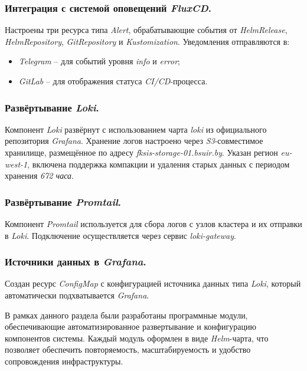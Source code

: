 \subsubsection{Интеграция с системой оповещений \textit{FluxCD}.} Настроены три ресурса типа \textit{Alert}, обрабатывающие события от \textit{HelmRelease}, \textit{HelmRepository}, \textit{GitRepository} и \textit{Kustomization}. Уведомления отправляются в:

\begin{itemize}
    \item \textit{Telegram} -- для событий уровня \textit{info} и \textit{error};
    \item \textit{GitLab} -- для отображения статуса \textit{CI/CD}-процесса.
\end{itemize}

\subsubsection{Развёртывание \textit{Loki}.} Компонент \textit{Loki} развёрнут с использованием чарта \textit{loki} из официального репозитория \textit{Grafana}. Хранение логов настроено через \textit{S3}-совместимое хранилище, размещённое по адресу \textit{fksis-storage-01.bsuir.by}. Указан регион \textit{eu-west-1}, включена поддержка компакции и удаления старых данных с периодом хранения \textit{672 часа}.

\subsubsection{Развёртывание \textit{Promtail}.} Компонент \textit{Promtail} используется для сбора логов с узлов кластера и их отправки в \textit{Loki}. Подключение осуществляется через сервис \textit{loki-gateway}.

\subsubsection{Источники данных в \textit{Grafana}.} Создан ресурс \textit{ConfigMap} с конфигурацией источника данных типа \textit{Loki}, который автоматически подхватывается \textit{Grafana}.

В рамках данного раздела были разработаны программные модули, обеспечивающие автоматизированное развертывание и конфигурацию компонентов системы. Каждый модуль оформлен в виде \textit{Helm}-чарта, что позволяет обеспечить повторяемость, масштабируемость и удобство сопровождения инфраструктуры.

